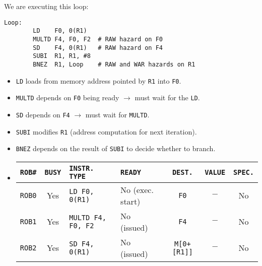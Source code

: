 \begin{examplebox}
    We are executing this loop:
    \begin{lstlisting}[language=unknown]
Loop:
        LD    F0, 0(R1)
        MULTD F4, F0, F2  # RAW hazard on F0
        SD    F4, 0(R1)   # RAW hazard on F4
        SUBI  R1, R1, #8
        BNEZ  R1, Loop    # RAW and WAR hazards on R1\end{lstlisting}
    \begin{itemize}
        \item \texttt{LD} loads from memory address pointed by \texttt{R1} into \texttt{F0}.
        \item \texttt{MULTD} depends on \texttt{F0} being ready $\rightarrow$ must wait for the \texttt{LD}.
        \item \texttt{SD} depends on \texttt{F4} $\rightarrow$ must wait for \texttt{MULTD}.
        \item \texttt{SUBI} modifies \texttt{R1} (address computation for next iteration).
        \item \texttt{BNEZ} depends on the result of \texttt{SUBI} to decide whether to branch.
    \end{itemize}
    \begin{itemize}
        \item {}
        \begin{center}
            \begin{adjustbox}{width={.92\textwidth},totalheight={\textheight},keepaspectratio}
                \begin{tabular}{@{} c | c | l | l | c | c | c @{}}
                    \toprule
                    \texttt{ROB\#}      & \texttt{BUSY}     & \texttt{INSTR. TYPE}      & \texttt{READY}        & \texttt{DEST.}        & \texttt{VALUE}        & \texttt{SPEC.}    \\
                    \midrule
                    \texttt{ROB0}       & Yes               & \texttt{LD F0, 0(R1)}     & No (exec. start)      & \texttt{F0}           & $-$                   & No                \\ [.3em]
                    \texttt{ROB1}       & Yes               & \texttt{MULTD F4, F0, F2} & No (issued)           & \texttt{F4}           & $-$                   & No                \\ [.3em]
                    \texttt{ROB2}       & Yes               & \texttt{SD F4, 0(R1)}     & No (issued)           & \texttt{M[0+[R1]]}    & $-$                   & No                \\ [.3em]

\end{tabular}
\end{adjustbox}
\end{center}
\end{itemize}
\end{examplebox}
